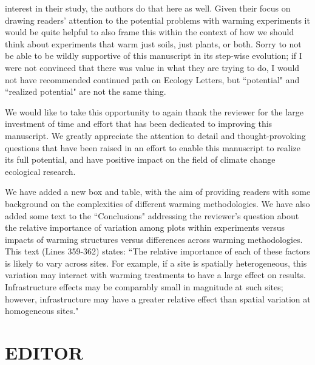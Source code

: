 \documentclass[11pt,a4paper]{letter}
\begin{document}
\begin{letter}{}
{interest in their study, the authors do that here as well. Given their focus on
drawing readers' attention to the potential problems with warming experiments
it would be quite helpful to also frame this within the context of how we should
think about experiments that warm just soils, just plants, or both.
Sorry to not be able to be wildly supportive of this manuscript in its step-wise
evolution; if I were not convinced that there was value in what they are trying
to do, I would not have recommended continued path on Ecology Letters, but
``potential" and ``realized potential" are not the same thing.}\\

\par We would like to take this opportunity to again thank the reviewer for the large investment of time and effort that has been dedicated to improving this manuscript. We greatly appreciate the attention to detail and thought-provoking questions that have been raised in an effort to enable this manuscript to realize its full potential, and have positive impact on the field of climate change ecological research. 

\par We have added a new box and table, with the aim of providing readers with some background on the complexities of different warming methodologies. We have also added some text to the ``Conclusions" addressing the reviewer's question about the relative importance of variation among plots within experiments versus impacts of warming structures versus differences across warming methodologies. This text (Lines 359-362) states: ``The relative importance of each of these factors is likely to vary across sites. For example, if a site is spatially heterogeneous, this variation may interact with warming treatments to have a large effect on results. Infrastructure effects may be comparably small in magnitude at such sites; however, infrastructure may have a greater relative effect than spatial variation at homogeneous sites."\\

\section{EDITOR}\\


\end{letter}
\end{document}
